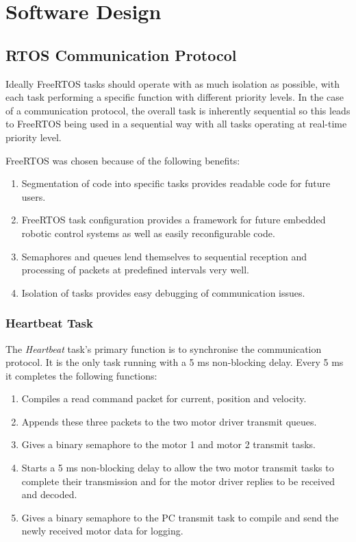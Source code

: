 \chapter{Software Design}
\section{RTOS Communication Protocol}

Ideally FreeRTOS tasks should operate with as much isolation as possible, with each task performing a specific function with different priority levels. In the case of a communication protocol, the overall task is inherently sequential so this leads to FreeRTOS being used in a sequential way with all tasks operating at real-time priority level. 

FreeRTOS was chosen because of the following benefits:

\begin{enumerate}
\item Segmentation of code into specific tasks provides readable code for future users.
\item FreeRTOS task configuration provides a framework for future embedded robotic control systems as well as easily reconfigurable code.
\item Semaphores and queues lend themselves to sequential reception and processing of packets at predefined intervals very well.
\item Isolation of tasks provides easy debugging of communication issues.
\end{enumerate}

\subsection{Heartbeat Task}
The \textit{Heartbeat} task's primary function is to synchronise the communication protocol. It is the only task running with a 5 ms non-blocking delay. Every 5 ms it completes the following functions:

\begin{enumerate}
\item Compiles a read command packet for current, position and velocity.
\item Appends these three packets to the two motor driver transmit queues. 
\item Gives a binary semaphore to the motor 1 and motor 2 transmit tasks.
\item Starts a 5 ms non-blocking delay to allow the two motor transmit tasks to complete their transmission and for the motor driver replies to be received and decoded.
\item Gives a binary semaphore to the PC transmit task to compile and send the newly received motor data for logging.
\end{enumerate}

